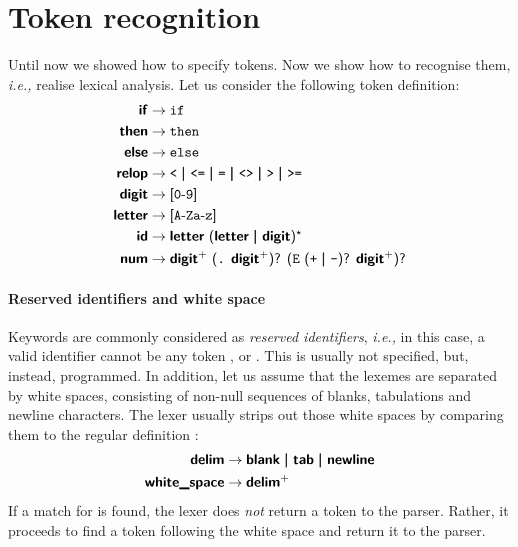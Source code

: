 \section{Token recognition}

Until now we showed how to specify tokens. Now we show how to
recognise them, \emph{i.e.,} realise lexical analysis. Let us consider the
following token definition:
\begin{align*}
\term{if} & \rightarrow \text{\exc{if}}\\
\term{then} & \rightarrow \text{\exc{then}}\\
\term{else} & \rightarrow \text{\exc{else}}\\
\term{relop} & \rightarrow \text{\exc{<} \disj \exc{<=} \disj \exc{=}
  \disj \exc{<>} \disj \exc{>} \disj \exc{>=}}\\
\term{digit} & \rightarrow \text{\lb\exc{0}\dash\exc{9}\rb{}}\\
\term{letter} & \rightarrow
\text{\lb\exc{A}\dash\exc{Z}\exc{a}\dash\exc{z}\rb}\\
\term{id} & \rightarrow \text{\term{letter} \lparen\term{letter} \disj
  \term{digit}\rparen\kleene}\\
\term{num} & \rightarrow \text{\term{digit}\plus{} \lparen\exc{.}
\term{digit}\plus\rparen\opt{} \lparen\exc{E} \lparen\exc{+} \disj
\exc{-}\rparen\opt{} \term{digit}\plus\rparen\opt}
\end{align*}

\paragraph{Reserved identifiers and white space}

Keywords are commonly considered as \emph{reserved identifiers},
\emph{i.e.,} in this case, a valid identifier cannot be any token
,  or . This is usually not specified,
but, instead, programmed. In addition, let us assume that the lexemes
are separated by white spaces, consisting of non-null sequences of
blanks, tabulations and newline characters. The lexer usually strips
out those white spaces by comparing them to the regular definition
:
\begin{align*}
\term{delim} & \rightarrow \text{\term{blank} \disj \term{tab} \disj
    \term{newline}}\\
\term{white\_space} & \rightarrow \text{\term{delim}\plus}
\end{align*}
If a match for  is found, the lexer does
\emph{not} return a token to the parser. Rather, it proceeds to find
a token following the white space and return it to the parser.

